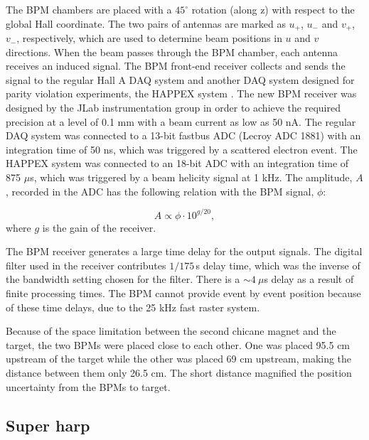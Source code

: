 \documentclass[english,review,number,sort&compress]{elsarticle}
\begin{document}
 The BPM chambers are placed with a $45^{\circ}$ rotation (along z) with respect to the global Hall coordinate. The two pairs of antennas are marked as $u_{+}$, $u_{-}$ and $v_{+}$, $v_{-}$, respectively, which are used to determine beam positions in $u$ and $v$ directions. When the beam passes through the BPM chamber, each antenna receives an induced signal. The BPM front-end receiver collects and sends the signal to the regular Hall A DAQ system and another DAQ system designed for parity violation experiments, the HAPPEX system \citep{ADC18bob}. The new BPM receiver was designed by the JLab instrumentation group \citep{mussonece652paper} in order to achieve the required precision at a level of 0.1 mm with a beam current as low as 50 nA. The regular DAQ system was connected to a 13-bit fastbus ADC (Lecroy ADC 1881) with an integration time of 50 ns, which was triggered by a scattered electron event. The HAPPEX system was connected to an 18-bit ADC with an integration time of 875 $\mu$s, which was triggered by a beam helicity signal at 1 kHz. The amplitude, $A$, recorded in the ADC has the following relation with the BPM signal, $\phi$:

\begin{equation}
A\propto\phi\cdot10^{g/20},\label{eq:adcsignalvsantenna}
\end{equation}
where $g$ is the gain of the receiver.

The BPM receiver generates a large time delay for the output signals. The digital filter used in the receiver contributes $1/175\,$s delay time, which was the inverse of the bandwidth setting chosen for the filter. There is a $\sim4\ \mu$s delay as a result of finite processing times. The BPM cannot provide event by event position because of these time delays, due to the 25 kHz fast raster system.

Because of the space limitation between the second chicane magnet and the target, the two BPMs were placed close to each other. One was placed 95.5 cm upstream of the target while the other was placed 69 cm upstream, making the distance between them only 26.5 cm. The short distance magnified the position uncertainty from the BPMs to target.


\subsection{Super harp}
\end{document}
